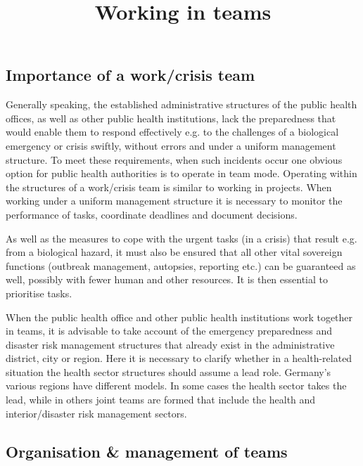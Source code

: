 \documentclass{article}
\begin{document}
\title{Working in teams}

\maketitle


\subsection{Importance of a work/crisis team}\label{H6850322}



Generally speaking, the established administrative structures of the public health offices, as well as other public health institutions, lack the preparedness that would enable them to respond effectively e.g. to the challenges of a biological emergency or crisis swiftly, without errors and under a uniform management structure. To meet these requirements, when such incidents occur one obvious option for public health authorities is to operate in team mode. Operating within the structures of a work/crisis team is similar to working in projects. When working under a uniform management structure it is necessary to monitor the performance of tasks, coordinate deadlines and document decisions.


As well as the measures to cope with the urgent tasks (in a crisis) that result e.g. from a biological hazard, it must also be ensured that all other vital sovereign functions (outbreak management, autopsies, reporting etc.) can be guaranteed as well, possibly with fewer human and other resources. It is then essential to prioritise tasks.


When the public health office and other public health institutions work together in teams, it is advisable to take account of the emergency preparedness and disaster risk management structures that already exist in the administrative district, city or region. Here it is necessary to clarify whether in a health-related situation the health sector structures should assume a lead role. Germany's various regions have different models. In some cases the health sector takes the lead, while in others joint teams are formed that include the health and interior/disaster risk management sectors.


\subsection{Organisation \& management of teams}\label{H7878642}
\end{document}
